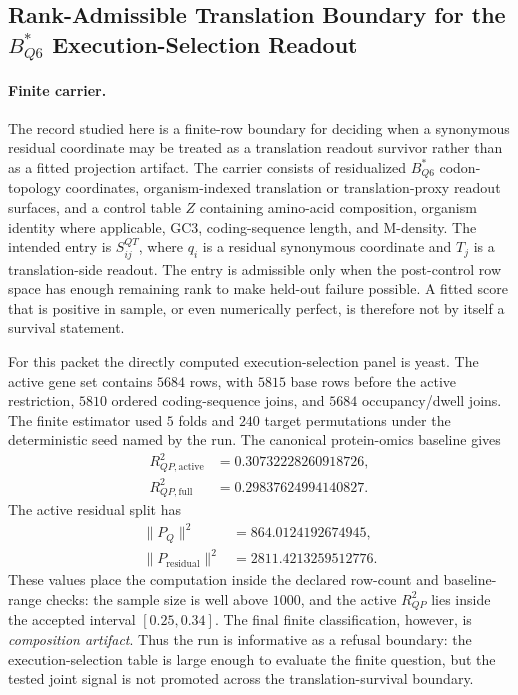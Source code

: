 \subsection{Rank-Admissible Translation Boundary for the $B^*_{Q6}$ Execution-Selection Readout}
\label{sec:bior-reality-q6-rank-admissible-execution-selection-boundary}

\paragraph{Finite carrier.}
The record studied here is a finite-row boundary for deciding when a synonymous residual coordinate may be treated as a translation readout survivor rather than as a fitted projection artifact.  The carrier consists of residualized $B^*_{Q6}$ codon-topology coordinates, organism-indexed translation or translation-proxy readout surfaces, and a control table $Z$ containing amino-acid composition, organism identity where applicable, GC3, coding-sequence length, and M-density.  The intended entry is $S^{QT}_{ij}$, where $q_i$ is a residual synonymous coordinate and $T_j$ is a translation-side readout.  The entry is admissible only when the post-control row space has enough remaining rank to make held-out failure possible.  A fitted score that is positive in sample, or even numerically perfect, is therefore not by itself a survival statement.

For this packet the directly computed execution-selection panel is yeast.  The active gene set contains $5684$ rows, with $5815$ base rows before the active restriction, $5810$ ordered coding-sequence joins, and $5684$ occupancy/dwell joins.  The finite estimator used $5$ folds and $240$ target permutations under the deterministic seed named by the run.  The canonical protein-omics baseline gives
$$
\begin{aligned}
R^2_{QP,\mathrm{active}} &= 0.30732228260918726,\\
R^2_{QP,\mathrm{full}} &= 0.29837624994140827.
\end{aligned}
$$
The active residual split has
$$
\begin{aligned}
\|P_Q\|^2 &= 864.0124192674945,\\
\|P_{\mathrm{residual}}\|^2 &= 2811.4213259512776.
\end{aligned}
$$
These values place the computation inside the declared row-count and baseline-range checks: the sample size is well above $1000$, and the active $R^2_{QP}$ lies inside the accepted interval $[0.25,0.34]$.  The final finite classification, however, is \emph{composition artifact}.  Thus the run is informative as a refusal boundary: the execution-selection table is large enough to evaluate the finite question, but the tested joint signal is not promoted across the translation-survival boundary.


